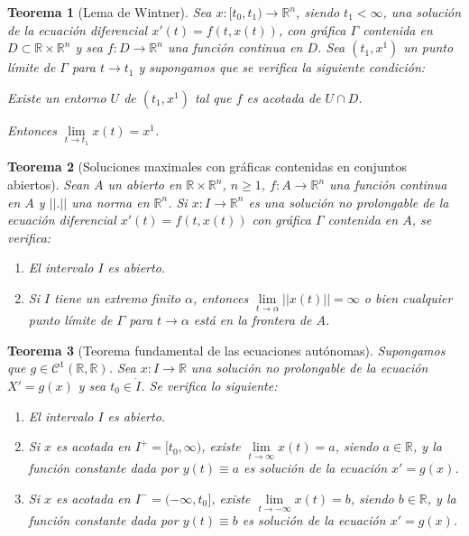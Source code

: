 \documentclass{report}
\newtheorem{theorem}{Teorema}[chapter]
\theoremstyle{remark}
\theoremstyle{remark}
\theoremstyle{remark}
\theoremstyle{definition}
\theoremstyle{definition}
\theoremstyle{definition}
\begin{document}
\begin{theorem}[Lema de Wintner]
    Sea $x: [t_0, t_1) \to \mathbb{R}^n$, siendo $t_1 < \infty$, una solución de la ecuación diferencial $x'(t) = f(t, x(t))$, con gráfica $\Gamma$ contenida en $D \subset \mathbb{R} \times \mathbb{R}^n$ y sea $f: D \to \mathbb{R}^n$ una función continua en $D$.
    Sea $(t_1, x^1)$ un punto límite de $\Gamma$ para $t \to t_1$ y supongamos que se verifica la siguiente condición:
    \begin{center}
        Existe un entorno $U$ de $(t_1, x^1)$ tal que $f$ es acotada de $U \cap D$.
    \end{center}

    Entonces $\lim\limits_{t \to t_1} x(t) = x^1$.
\end{theorem}

\begin{theorem}[Soluciones maximales con gráficas contenidas en conjuntos abiertos]
    Sean $A$ un abierto en $\mathbb{R} \times \mathbb{R}^n$, $n \geq 1$, $f: A \to \mathbb{R}^n$ una función continua en $A$ y $||.||$ una norma en $\mathbb{R}^n$.
    Si $x: I \to \mathbb{R}^n$ es una solución no prolongable de la ecuación diferencial $x'(t) = f(t, x(t))$ con gráfica $\Gamma$ contenida en $A$, se verifica:
    \begin{enumerate}
        \item El intervalo $I$ es abierto.
        \item Si $I$ tiene un extremo finito $\alpha$, entonces $\lim\limits_{t \to \alpha} ||x(t)|| = \infty$ o bien cualquier punto límite de $\Gamma$ para $t \to \alpha$ está en la frontera de $A$.
    \end{enumerate}
\end{theorem}

\begin{theorem}[Teorema fundamental de las ecuaciones autónomas]
    Supongamos que $g \in \mathcal{C}^1(\mathbb{R}, \mathbb{R})$.
    Sea $x: I \to \mathbb{R}$ una solución no prolongable de la ecuación $X' = g(x)$ y sea $t_0 \in \dot{I}$.
    Se verifica lo siguiente:
    \begin{enumerate}
        \item El intervalo $I$ es abierto.
        \item Si $x$ es acotada en $I^+ = [t_0, \infty)$, existe $\lim\limits_{t \to \infty} x(t) = a$, siendo $a \in \mathbb{R}$, y la función constante dada por $y(t) \equiv a$ es solución de la ecuación $x' = g(x)$.
        \item Si $x$ es acotada en $I^- = (-\infty, t_0]$, existe $\lim\limits_{t \to -\infty} x(t) = b$, siendo $b \in \mathbb{R}$, y la función constante dada por $y(t) \equiv b$ es solución de la ecuación $x' = g(x)$.
    \end{enumerate}
\end{theorem}
\end{document}
